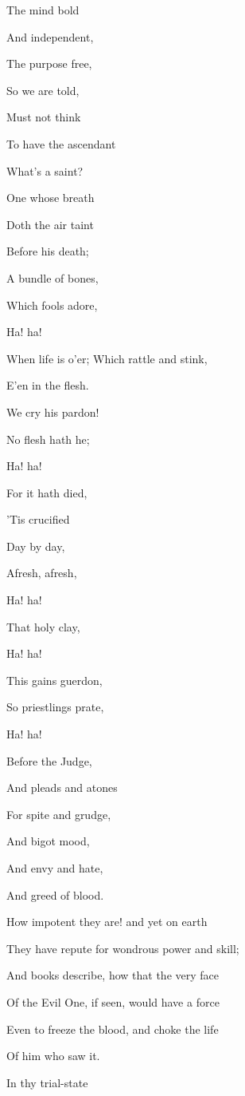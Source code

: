 The mind bold

And independent,

The purpose free,

So we are told,

Must not think

To have the ascendant

What's a saint?

One whose breath

Doth the air taint

Before his death;

A bundle of bones,

Which fools adore,

Ha! ha!

When life is o'er; Which rattle and stink,

E'en in the flesh.

We cry his pardon!

No flesh hath he;

Ha! ha!

For it hath died,

'Tis crucified

Day by day,

Afresh, afresh,

Ha! ha!

That holy clay,

Ha! ha!

This gains guerdon,

So priestlings prate,

Ha! ha!

Before the Judge,

And pleads and atones

For spite and grudge,

And bigot mood,

And envy and hate,

And greed of blood.


How impotent they are! and yet on earth

They have repute for wondrous power and skill;

And books describe, how that the very face

Of the Evil One, if seen, would have a force

Even to freeze the blood, and choke the life

Of him who saw it.


In thy trial-state

